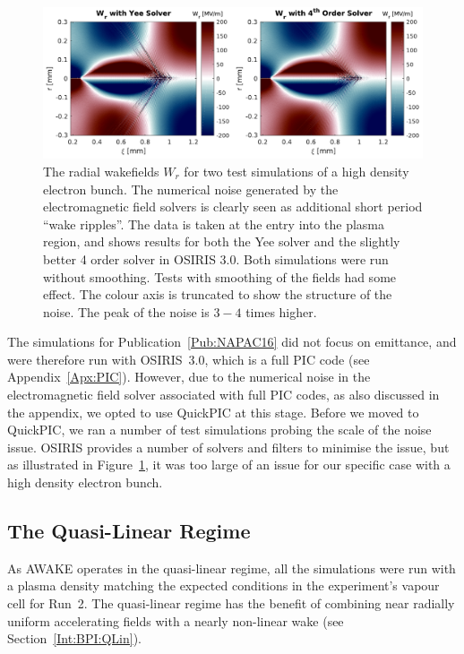 \begin{figure}[hbt]
    \centering
    \includegraphics[width=0.999\linewidth]{figures/EMFSolverNoise}
    \caption{\label{Fig:SimA:EMFNoise}
        The radial wakefields $W_r$ for two test simulations of a high density electron bunch.
        The numerical noise generated by the electromagnetic field solvers is clearly seen as additional short period ``wake ripples''.
        The data is taken at the entry into the plasma region, and shows results for both the Yee solver and the slightly better 4 order solver in OSIRIS 3.0.
        Both simulations were run without smoothing.
        Tests with smoothing of the fields had some effect.
        The colour axis is truncated to show the structure of the noise.
        The peak of the noise is $3-4$ times higher.
    }
\end{figure}

The simulations for Publication~\ref{Pub:NAPAC16} did not focus on emittance, and were therefore run with OSIRIS~3.0, which is a full PIC code (see Appendix~\ref{Apx:PIC}).
However, due to the numerical noise in the electromagnetic field solver associated with full PIC codes, as also discussed in the appendix, we opted to use QuickPIC at this stage.
Before we moved to QuickPIC, we ran a number of test simulations probing the scale of the noise issue.
OSIRIS provides a number of solvers and filters to minimise the issue, but as illustrated in Figure~\ref{Fig:SimA:EMFNoise}, it was too large of an issue for our specific case with a high density electron bunch.

\subsection{The Quasi-Linear Regime}
\label{SimA:QLin}

As AWAKE operates in the quasi-linear regime, all the simulations were run with a plasma density matching the expected conditions in the experiment's vapour cell for Run~2.
The quasi-linear regime has the benefit of combining near radially uniform accelerating fields with a nearly non-linear wake (see Section~\ref{Int:BPI:QLin}).

